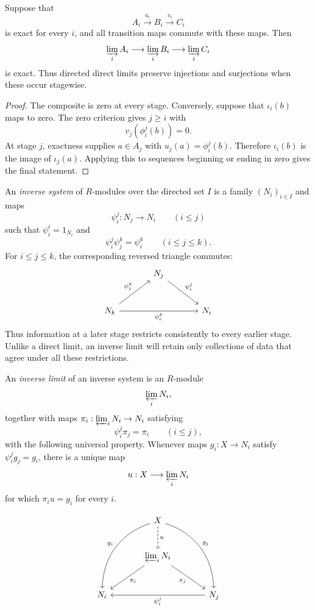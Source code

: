 \begin{theorem}\label{thm:direct-limit-exact}
Suppose that
\[
A_i\xrightarrow{u_i}B_i\xrightarrow{v_i}C_i
\]
is exact for every \(i\), and all transition maps commute with these maps.
Then
\[
\varinjlim_iA_i\longrightarrow\varinjlim_iB_i
\longrightarrow\varinjlim_iC_i
\]
is exact.  Thus directed direct limits preserve injections and surjections
when these occur stagewise.
\end{theorem}
\begin{proof}
The composite is zero at every stage.  Conversely, suppose that
\(\iota_i(b)\) maps to zero.  The zero criterion gives \(j\geq i\) with
\[
v_j(\phi_i^j(b))=0.
\]
At stage \(j\), exactness supplies \(a\in A_j\) with
\(u_j(a)=\phi_i^j(b)\).  Therefore \(\iota_i(b)\) is the image of
\(\iota_j(a)\).  Applying this to sequences beginning or ending in zero gives
the final statement.
\end{proof}

\begin{definition}
An \emph{inverse system} of \(R\)-modules over the directed set \(I\) is a
family \((N_i)_{i\in I}\) and maps
\[
\psi_i^j:N_j\longrightarrow N_i\qquad(i\leq j)
\]
such that \(\psi_i^i=1_{N_i}\) and
\[
\psi_i^j\psi_j^k=\psi_i^k
\qquad(i\leq j\leq k).
\]
For \(i\leq j\leq k\), the corresponding reversed triangle commutes:
\[
\begin{tikzcd}[column sep=large,row sep=large]
& N_j \arrow[dr,"\psi_i^j"] & \\
N_k \arrow[ur,"\psi_j^k"] \arrow[rr,"\psi_i^k"'] && N_i
\end{tikzcd}
\]
Thus information at a later stage restricts consistently to every earlier
stage.  Unlike a direct limit, an inverse limit will retain only collections
of data that agree under all these restrictions.
\end{definition}

\begin{definition}
An \emph{inverse limit} of an inverse system is an \(R\)-module
\[
\varprojlim_iN_i,
\]
together with maps \(\pi_i:\varprojlim_iN_i\to N_i\) satisfying
\[
\psi_i^j\pi_j=\pi_i
\qquad(i\leq j),
\]
with the following universal property.  Whenever maps \(g_i:X\to N_i\)
satisfy \(\psi_i^jg_j=g_i\), there is a unique map
\[
u:X\longrightarrow\varprojlim_iN_i
\]
for which \(\pi_i u=g_i\) for every \(i\).
\end{definition}

\[
\begin{tikzcd}[column sep=large,row sep=large]
& X \arrow[d,dashed,"u"] \arrow[ddl,bend right=35,"g_i"']
  \arrow[ddr,bend left=35,"g_j"] & \\
& \varprojlim_iN_i \arrow[dl,"\pi_i"] \arrow[dr,"\pi_j"'] & \\
N_i && N_j \arrow[ll,"\psi_i^j"]
\end{tikzcd}
\]

